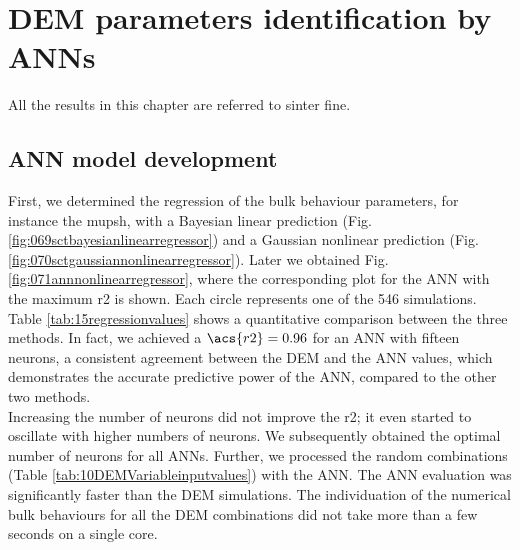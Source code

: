 
\chapter{DEM parameters identification by ANNs}
\label{cap:demparameters}

All the results in this chapter are referred to sinter fine.

\section{ANN model development}
\label{sec:annmodeldev}



First, we determined the regression of the bulk behaviour parameters, for
instance the \acs{mupsh}, 
with a Bayesian linear prediction (Fig.
\ref{fig:069sctbayesianlinearregressor}) and a Gaussian nonlinear prediction
(Fig.  \ref{fig:070sctgaussiannonlinearregressor}). 
Later we obtained Fig.
\ref{fig:071annnonlinearregressor}, where the corresponding plot for the \acs{ANN} with the maximum \acs{r2} is shown. 
Each circle represents one of the 546 simulations.
Table \ref{tab:15regressionvalues} shows a quantitative comparison between the
three methods. 
In fact, 
we achieved a $\acs{r2} = 0.96$ for an \acs{ANN} with fifteen neurons,
a consistent agreement between the 
\acs{DEM} and the \acs{ANN} values, which demonstrates the accurate predictive power of
the \acs{ANN}, compared to the other two methods.\\ 
Increasing the number of neurons did not improve the \acs{r2}; it even started to
oscillate with higher numbers of neurons.
We subsequently obtained the optimal number of neurons for all \acs{ANNs}.
Further, we processed the random combinations (Table
\ref{tab:10DEMVariableinputvalues}) with the \acs{ANN}.
The \acs{ANN} evaluation was significantly faster than the \acs{DEM} simulations. The
individuation of the numerical bulk behaviours for all the \acs{DEM} combinations
did not take more than a few seconds on a single core.



